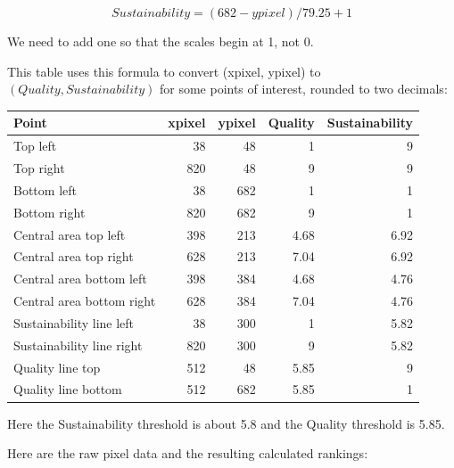 \documentclass[article,10pt,microtype]{article}
\begin{document}
\begin{equation}
Sustainability = (682 - ypixel)/79.25 + 1
\end{equation}

We need to add one so that the scales begin at 1, not 0.

This table uses this formula to convert (xpixel, ypixel) to \((Quality, Sustainability)\) for some points of interest, rounded to two decimals:

\begin{center}
\begin{tabular}{lrrrr}
Point & xpixel & ypixel & Quality & Sustainability\\
\hline
Top left & 38 & 48 & 1 & 9\\
Top right & 820 & 48 & 9 & 9\\
Bottom left & 38 & 682 & 1 & 1\\
Bottom right & 820 & 682 & 9 & 1\\
Central area top left & 398 & 213 & 4.68 & 6.92\\
Central area top right & 628 & 213 & 7.04 & 6.92\\
Central area bottom left & 398 & 384 & 4.68 & 4.76\\
Central area bottom right & 628 & 384 & 7.04 & 4.76\\
Sustainability line left & 38 & 300 & 1 & 5.82\\
Sustainability line right & 820 & 300 & 9 & 5.82\\
Quality line top & 512 & 48 & 5.85 & 9\\
Quality line bottom & 512 & 682 & 5.85 & 1\\
\end{tabular}
\end{center}

Here the Sustainability threshold is about 5.8 and the Quality threshold is 5.85.

Here are the raw pixel data and the resulting calculated rankings:
\end{document}
